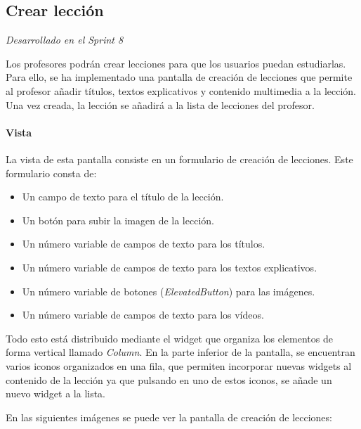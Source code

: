 \subsection{Crear lección} 

\textit{Desarrollado en el Sprint 8}

Los profesores podrán crear lecciones para que los usuarios puedan estudiarlas. Para ello, se ha implementado una pantalla de creación de lecciones que permite al profesor añadir títulos, textos explicativos y contenido multimedia a la lección. Una vez creada, la lección se añadirá a la lista de lecciones del profesor.


\paragraph*{Vista}
La vista de esta pantalla consiste en un formulario de creación de lecciones. Este formulario consta de:
\begin{itemize}
  \item Un campo de texto para el título de la lección.
  \item Un botón para subir la imagen de la lección.
  \item Un número variable de campos de texto para los títulos.
  \item Un número variable de campos de texto para los textos explicativos.
  \item Un número variable de botones (\textit{ElevatedButton}) para las imágenes.
  \item Un número variable de campos de texto para los vídeos.
\end{itemize}

Todo esto está distribuido mediante el widget que organiza los elementos de forma vertical llamado \textit{Column}. 
En la parte inferior de la pantalla, se encuentran varios iconos organizados en una fila, que permiten incorporar nuevas widgets al contenido de la lección
ya que pulsando en uno de estos iconos, se añade un nuevo widget a la lista.

\newpage
En las siguientes imágenes se puede ver la pantalla de creación de lecciones:

